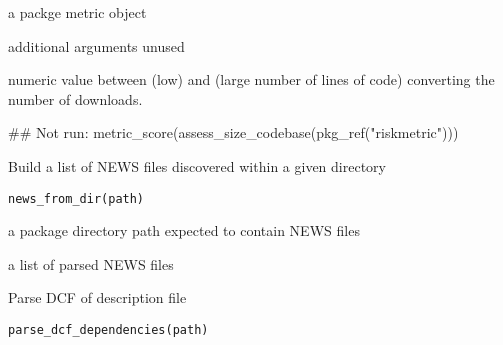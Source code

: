 \documentclass[a4paper]{book}
\begin{document}
%
\begin{Arguments}
\begin{ldescription}
\item[\code{x}] a  packge metric object

\item[\code{...}] additional arguments unused
\end{ldescription}
\end{Arguments}
%
\begin{Value}
numeric value between  (low) and  (large number of lines of code) converting the number of downloads.
\end{Value}
%
\begin{Examples}
\begin{ExampleCode}
## Not run: metric_score(assess_size_codebase(pkg_ref("riskmetric")))

\end{ExampleCode}
\end{Examples}
%
\begin{Description}
Build a list of NEWS files discovered within a given directory
\end{Description}
%
\begin{Usage}
\begin{verbatim}
news_from_dir(path)
\end{verbatim}
\end{Usage}
%
\begin{Arguments}
\begin{ldescription}
\item[\code{path}] a package directory path expected to contain NEWS files
\end{ldescription}
\end{Arguments}
%
\begin{Value}
a list of parsed NEWS files
\end{Value}
%
\begin{Description}
Parse DCF of description file
\end{Description}
%
\begin{Usage}
\begin{verbatim}
parse_dcf_dependencies(path)
\end{verbatim}
\end{Usage}
\end{document}
